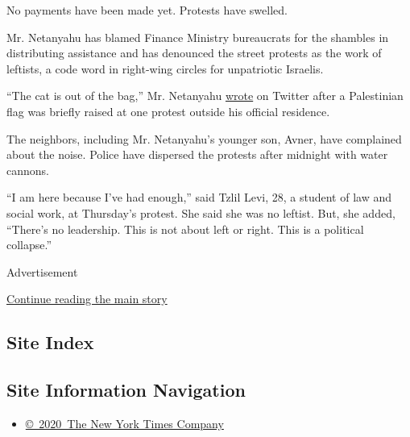 No payments have been made yet. Protests have swelled.

Mr. Netanyahu has blamed Finance Ministry bureaucrats for the shambles
in distributing assistance and has denounced the street protests as the
work of leftists, a code word in right-wing circles for unpatriotic
Israelis.

``The cat is out of the bag,'' Mr. Netanyahu
\href{https://twitter.com/netanyahu/status/1284764559803322368}{wrote}
on Twitter after a Palestinian flag was briefly raised at one protest
outside his official residence.

The neighbors, including Mr. Netanyahu's younger son, Avner, have
complained about the noise. Police have dispersed the protests after
midnight with water cannons.

``I am here because I've had enough,'' said Tzlil Levi, 28, a student of
law and social work, at Thursday's protest. She said she was no leftist.
But, she added, ``There's no leadership. This is not about left or
right. This is a political collapse.''

Advertisement

\protect\hyperlink{after-bottom}{Continue reading the main story}

\hypertarget{site-index}{%
\subsection{Site Index}\label{site-index}}

\hypertarget{site-information-navigation}{%
\subsection{Site Information
Navigation}\label{site-information-navigation}}

\begin{itemize}
\tightlist
\item
  \href{https://help.nytimes.com/hc/en-us/articles/115014792127-Copyright-notice}{©~2020~The
  New York Times Company}
\end{itemize}

